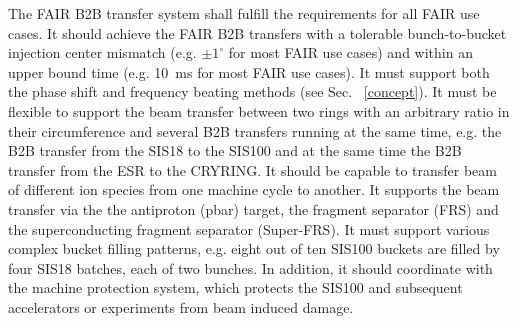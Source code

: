 The FAIR B2B transfer system shall fulfill the requirements for all FAIR use cases. It should achieve the FAIR B2B transfers with a tolerable bunch-to-bucket injection center mismatch (e.g. $\pm 1^\circ$ for most FAIR use cases) and within an upper bound time (e.g. \SI{10}{\ms} for most FAIR use cases). It must support both the phase shift and frequency beating methods (see Sec. ~\ref{concept}). It must be flexible to support the beam transfer between two rings with an arbitrary ratio in their circumference and several B2B transfers running at the same time, e.g. the B2B transfer from the SIS18 to the SIS100 and at the same time the B2B transfer from the ESR to the CRYRING. It should be capable to transfer beam of different ion species from one machine cycle to another. It supports the beam transfer via the the antiproton (pbar) target, the fragment separator (FRS) and the superconducting fragment separator (Super-FRS). It must support various complex bucket filling patterns, e.g. eight out of ten SIS100 buckets are filled by four SIS18 batches, each of two bunches. In addition, it  should coordinate with the machine protection system, which protects the SIS100 and subsequent accelerators or experiments from beam induced damage. 